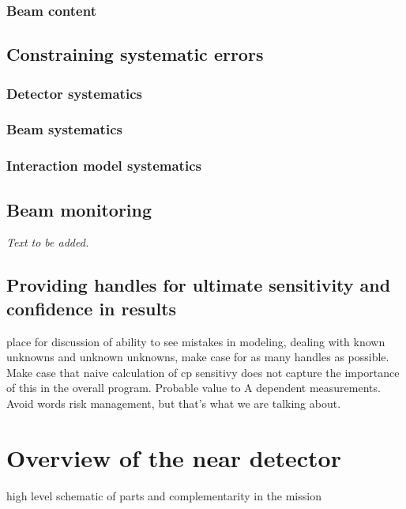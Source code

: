 \subsubsection{Beam \nue content}

\subsection{Constraining systematic errors}
\label{sec:syserr}
\subsubsection{Detector systematics}
\subsubsection{Beam systematics}
\subsubsection{Interaction model systematics}


\subsection{Beam monitoring}
\label{sec:beammon}

{\it Text to be added.}

\subsection{Providing handles for ultimate sensitivity and confidence in results}

place for discussion of ability to see mistakes in modeling, dealing with known unknowns and unknown unknowns, make case for as many handles as possible.  Make case that naive calculation of cp sensitivy does not capture the importance of this in the overall program.  Probable value to A dependent measurements.  Avoid words risk management, but that's what we are talking about.


\section{Overview of the near detector}
\label{sec:exsum-nd-overview}
%

high level schematic of parts and complementarity in the mission



